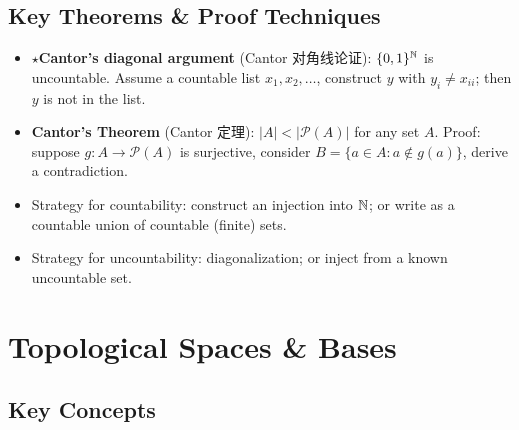 \documentclass{article}
\newcommand{\starKey}{\textcolor{red!65!black}{\textbf{$\star$}}}
\begin{document}
\subsection{Key Theorems \& Proof Techniques}

\begin{itemize}
  \item \starKey \textbf{Cantor's diagonal argument} (Cantor 对角线论证):
  $\{0,1\}^{\mathbb{N}}$ is uncountable.
  Assume a countable list $x_1,x_2,\ldots$, construct $y$ with $y_i\neq x_{ii}$;
  then $y$ is not in the list.
  \item \textbf{Cantor's Theorem} (Cantor 定理): $|A|<|\mathcal{P}(A)|$ for any set $A$.
  Proof: suppose $g:A\to\mathcal{P}(A)$ is surjective, consider
  $B=\{a\in A:a\notin g(a)\}$, derive a contradiction.
  \item Strategy for countability: construct an injection into $\mathbb{N}$; or write as
  a countable union of countable (finite) sets.
  \item Strategy for uncountability: diagonalization; or inject from a known uncountable set.
\end{itemize}

\section{Topological Spaces \& Bases}

\subsection{Key Concepts}
\end{document}
